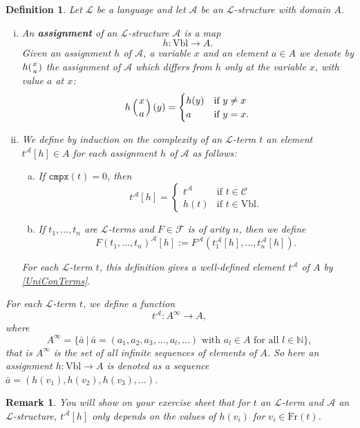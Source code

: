 \documentclass[11pt]{article}
\newcommand{\cmpx}{\texttt{cmpx}}
\newtheorem{remark}[theorem]{Remark}
\newtheorem{definition}[theorem]{Definition}
\newcommand{\mcal}[1]{\mathcal{#1}}
\newcommand{\N}{\mathbb{N}}
\newcommand{\st}{\ \vert \ }
\begin{document}
\begin{definition}
Let $\mcal{L}$ be a language and let $\mcal{A}$ be an $\mcal{L}$-structure with domain $A$.
\begin{enumerate}[(i)]
\item
An \textbf{assignment} of an $\mcal{L} $-structure $\mcal{A} $
is a map \[h:\textrm{Vbl} \rightarrow A .\]
Given an assignment $h$ of $\mcal{A}$, a variable $x$ and an element $a\in A$
we denote by $h({x\atop a})$ the assignment of $\mcal{A} $ which differs from $h$
only at the variable $x$, with value $a$ at $x$:
\[h\left({x\atop a}\right)(y)=
  \begin{cases}
    h(y) & \text{if }y\neq x \\
    a & \text{if }y=x.
  \end{cases}
\]

\item
We define by induction on the complexity of
an $\mcal{L}$-term $t$ an element $t^\mcal{A} [h]\in A$
for each assignment $h$ of $\mcal{A} $ as follows:

\smallskip
\begin{enumerate}[(a)]
\item If $\cmpx(t)=0$, then
$$t^\mcal{A} [h]=
  \begin{cases}
    t^\mcal{A} & \text{if }t\in \mcal{C}  \\
    h(t) & \text{if }t\in \textrm{Vbl} .
  \end{cases}
$$
\item If
$t_1,\ldots,t_n$ are $\mcal{L} $-terms and $F\in \mcal{F} $
is of arity $n$, then we define
\[F(t_1,\ldots,t_n)^\mcal{A} [h]:=F^\mcal{A} (t_1^\mcal{A} [h],\ldots,t_n^\mcal{A} [h]).\]
\noindent
\end{enumerate}
For each $\mcal{L}$-term $t$, this definition gives a well-defined element $t^\mcal{A}$ of $A$ by \ref{UniConTerms}.

\end{enumerate}
For each $\mcal{L}$-term $t$, we define a function
 \[t^\mcal{A}:A^\infty\rightarrow A,\]
 where \[A^\infty=\{ \bar{a} \st \bar{a}=(a_1,a_2,a_3,\ldots, a_l,\ldots) \text{ with } a_l\in A \text{ for all } l\in \N\},\]
 that is $A^\infty$ is the set of all infinite sequences of elements of $A$.
 So here an assignment $h:\textrm{Vbl}\rightarrow A$ is denoted as a sequence ${\bar a}=(h(v_1),h(v_2),h(v_3),\ldots)$.
\end{definition}

\begin{remark}
You will show on your exercise sheet that for $t$ an $\mcal{L}$-term and $\mcal{A}$ an $\mcal{L}$-structure, $t^\mcal{A}[h]$ only depends on the values of $h(v_i)$ for $v_i\in \textrm{Fr}(t)$.
\end{remark}
\end{document}
